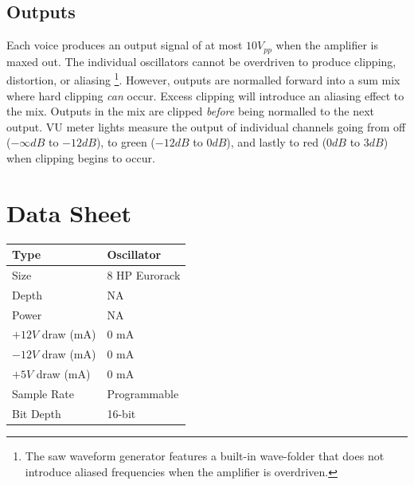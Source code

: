 \documentclass[12pt,letter]{article}
\begin{document}
\subsection{Outputs}

Each voice produces an output signal of at most $10V_{pp}$ when the amplifier is maxed out. The individual oscillators cannot be overdriven to produce clipping, distortion, or aliasing \footnote{The saw waveform generator features a built-in wave-folder that does not introduce aliased frequencies when the amplifier is overdriven.}. However, outputs are normalled forward into a sum mix where hard clipping \textit{can} occur. Excess clipping will introduce an aliasing effect to the mix. Outputs in the mix are clipped \textit{before} being normalled to the next output. VU meter lights measure the output of individual channels going from off ($-\infty dB$ to $-12dB$), to green ($-12dB$ to $0dB$), and lastly to red ($0dB$ to $3dB$) when clipping begins to occur.


\clearpage
\section{Data Sheet}

\begin{table}[!htp]
\begin{tabular}{|l|l|}
\hline
Type             & Oscillator               \\
\hline
Size             & 8 HP Eurorack            \\
\hline
Depth            & NA                       \\
\hline
Power            & NA                       \\ %
\hline
$+12V$ draw (mA) & 0 mA                     \\
\hline
$-12V$ draw (mA) & 0 mA                     \\
\hline
$+5V$ draw (mA)  & 0 mA                     \\
\hline
Sample Rate      & Programmable             \\
\hline
Bit Depth        & 16-bit                   \\
\hline
\end{tabular}
\end{table}


\clearpage
\renewcommand\refname{References}
\nocite{*}


\end{document}
